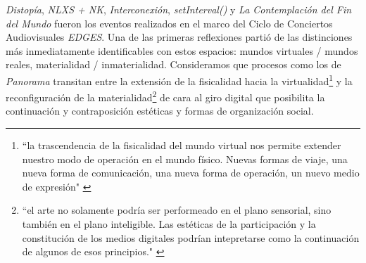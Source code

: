 

\iffalse
\begin{itemize}
\item Distopía
\item domo 
\item Underborders
\item Milena y Concepción
\item setInterval()
\item Contemplación del fin del Mundo
\item sistemas mixtos
\item espacio y performance fusionados en Contemplación
\end{itemize}
\fi


\textit{Distopía}, \textit{NLXS + NK}, \textit{Interconexión}, \textit{setInterval()} y \textit{La Contemplación del Fin del Mundo} fueron los eventos realizados en el marco del Ciclo de Conciertos Audiovisuales \textit{EDGES}. Una de las primeras reflexiones partió de las distinciones más inmediatamente identificables con estos espacios: mundos virtuales / mundos reales, materialidad / inmaterialidad. Consideramos que procesos como los de \textit{Panorama} transitan entre la extensión de la fisicalidad hacia la virtualidad\footnote{``la trascendencia de la fisicalidad del mundo virtual nos permite extender nuestro modo de operación en el mundo físico. Nuevas formas de viaje, una nueva forma de comunicación, una nueva forma de operación, un nuevo medio de expresión" \citep[pp.~49]{cyberspace}}  y la reconfiguración de la materialidad\footnote{``el arte no solamente podría ser performeado en el plano sensorial, sino también en el plano inteligible. Las estéticas de la participación y la constitución de los medios digitales podrían intepretarse como la continuación de algunos de esos principios." \citep[pp.~190]{andreasosa}} de cara al giro digital que posibilita la continuación y contraposición estéticas y formas de organización social. 

\color{black}




